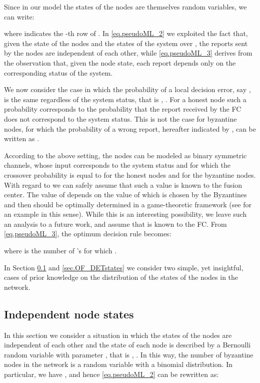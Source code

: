 \documentclass[10pt,peerreview,draftcls,onecolumn]{IEEEtran}
\begin{document}
Since in our model the states of the nodes are themselves random variables, we can write:





where  indicates the -th row of . In \eqref{eq.pseudoML_2} we exploited the fact that, given the state of the nodes and the states of the system over , the reports sent by the nodes are independent of each other, while \eqref{eq.pseudoML_3} derives from the observation that, given the node state, each report depends only on the corresponding status of the system.


We now consider the case in which the probability of a local decision error, say , is the same regardless of the system status, that is , . For a honest node such a probability corresponds to the probability that the report received by the FC does not correspond to the system status. This is not the case for byzantine nodes, for which the probability of a wrong report, hereafter indicated by , can be written as .

According to the above setting, the nodes can be modeled as binary symmetric channels, whose input corresponds to the system status and for which the crossover probability is equal to  for the honest nodes and  for the byzantine nodes. With regard to  we can safely assume that such a value is known to the fusion center. The value of  depends on the value of   which is chosen by the Byzantines and then should be optimally determined in a game-theoretic framework (see \cite{KBKV13} for an example in this sense). While this is an interesting possibility, we leave such an analysis to a future work, and assume that  is known to the FC.
From \eqref{eq.pseudoML_3}, the optimum decision rule becomes:

where  is the number of 's for which .

In Section \ref{sec.OF_Random} and \ref{sec.OF_DETstates} we consider two simple, yet insightful, cases of prior knowledge on the distribution of the states of the nodes in the network.

\subsection{Independent node states}
\label{sec.OF_Random}

In this section we consider a situation in which the states of the nodes are independent of each other and the state of each node is described by a Bernoulli random variable with parameter , that is , . In this way, the number of byzantine nodes in the network is a random variable with a binomial distribution.
In particular, we have , and hence \eqref{eq.pseudoML_2} can be rewritten as:
\end{document}
